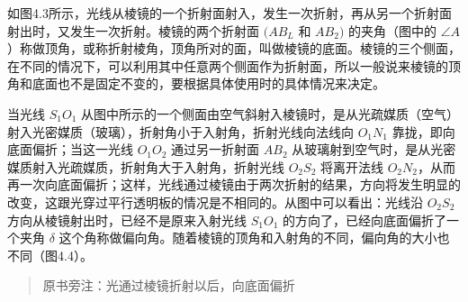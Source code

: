 如图4.3所示，光线从棱镜的一个折射面射入，发生一次折射，再从另一个折射面射出时，又发生一次折射。棱镜的两个折射面
\((AB_{L}\) 和 \(AB_{2})\) 的夹角（图中的
\(\angle A\)）称做顶角，或称折射棱角，顶角所对的面，叫做棱镜的底面。棱镜的三个侧面，在不同的情况下，可以利用其中任意两个侧面作为折射面，所以一般说来棱镜的顶角和底面也不是固定不变的，要根据具体使用时的具体情况来决定。

当光线 \(S_{1}O_{1}\)
从图中所示的一个侧面由空气斜射入棱镜时，是从光疏媒质（空气）射入光密媒质（玻璃），折射角小于入射角，折射光线向法线向
\(O_{1}N_{1}\) 靠拢，即向底面偏折；当这一光线 \(O_{1}O_{2}\)
通过另一折射面 \(AB_{2}\)
从玻璃射到空气时，是从光密媒质射入光疏媒质，折射角大于入射角，折射光线
\(O_{2}S_{2}\) 将离开法线
\(O_{2}N_{2}\)，从而再一次向底面偏折；这样，光线通过棱镜由于两次折射的结果，方向将发生明显的改变，这跟光穿过平行透明板的情况是不相同的。从图中可以看出：光线沿
\(O_{2}S_{2}\) 方向从棱镜射出时，已经不是原来入射光线 \(S_{1}O_{1}\)
的方向了，已经向底面偏折了一个夹角 \(\delta\)
这个角称做偏向角。随着棱镜的顶角和入射角的不同，偏向角的大小也不同（图4.4）。

\begin{quote}
原书旁注：光通过棱镜折射以后，向底面偏折
\end{quote}

